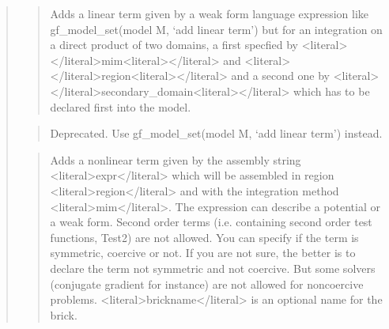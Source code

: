 \documentclass[a4paper,11pt,english]{sphinxmanual}
\begin{document}
\begin{quote}
\sphinxAtStartPar
{}
\begin{quote}

\sphinxAtStartPar
Adds a linear term given by a weak form language expression like
gf\_model\_set(model M, ‘add linear term’) but for an integration on a direct
product of two domains, a first specfied by \textless{}literal\textgreater{}\textless{}/literal\textgreater{}mim\textless{}literal\textgreater{}\textless{}/literal\textgreater{} and \textless{}literal\textgreater{}\textless{}/literal\textgreater{}region\textless{}literal\textgreater{}\textless{}/literal\textgreater{}
and a second one by \textless{}literal\textgreater{}\textless{}/literal\textgreater{}secondary\_domain\textless{}literal\textgreater{}\textless{}/literal\textgreater{} which has to be declared
first into the model.
\end{quote}

\sphinxAtStartPar
{}
\begin{quote}

\sphinxAtStartPar
Deprecated. Use gf\_model\_set(model M, ‘add linear term’) instead.
\end{quote}

\sphinxAtStartPar
{}
\begin{quote}

\sphinxAtStartPar
Adds a nonlinear term given by the assembly string \textless{}literal\textgreater{}expr\textless{}/literal\textgreater{} which will
be assembled in region \textless{}literal\textgreater{}region\textless{}/literal\textgreater{} and with the integration method \textless{}literal\textgreater{}mim\textless{}/literal\textgreater{}.
The expression can describe a potential or a weak form. Second order
terms (i.e. containing second order test functions, Test2) are not
allowed.
You can specify if the term is symmetric, coercive or not.
If you are not sure, the better is to declare the term not symmetric
and not coercive. But some solvers (conjugate gradient for instance)
are not allowed for non\sphinxhyphen{}coercive problems.
\textless{}literal\textgreater{}brickname\textless{}/literal\textgreater{} is an optional name for the brick.
\end{quote}


\end{quote}
\end{document}
